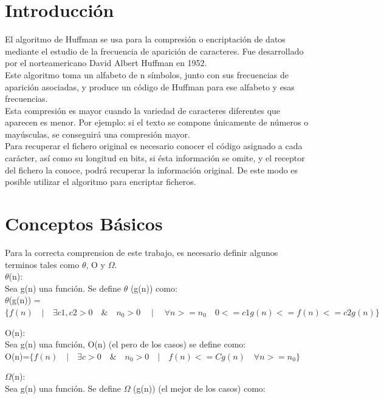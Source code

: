 \documentclass[spanish]{article}
\begin{document}
	\section{Introducci\'on}
	El algoritmo de Huffman se usa para la compresión o encriptación de datos mediante el estudio de la frecuencia de aparición de caracteres. Fue desarrollado por el norteamericano David Albert Huffman en 1952.\\
	Este algoritmo toma un alfabeto de n símbolos, junto con sus frecuencias de aparición asociadas, y produce un código de Huffman para ese alfabeto y esas frecuencias.\\
	Esta compresión es mayor cuando la variedad de caracteres diferentes que aparecen es menor. Por ejemplo: si el texto se compone únicamente de números o mayúsculas, se conseguirá una compresión mayor.\\
	Para recuperar el fichero original es necesario conocer el código asignado a cada carácter, así como su longitud en bits, si ésta información se omite, y el receptor del fichero la conoce, podrá recuperar la información original. De este modo es posible utilizar el algoritmo para encriptar ficheros.\\

\newpage
	\section{Conceptos B\'asicos}
	Para la correcta comprension de este trabajo, es necesario definir algunos terminos tales como $\theta$, O y $\Omega$.\\
	 $\theta$(n):\\
		Sea g(n) una función. Se define  $\theta$ (g(n)) como:\\
		
		 	$\theta$(g(n)) = $\{ f(n) \quad | \quad \exists c1,c2>0 \quad \& \quad n_{0}>0 \quad \mid \quad \forall n>=n_{0} \quad 0<= c1g(n) <= f(n) <= c2g(n) \}$
	\bigskip		 	
		 	
	O(n):\\
		Sea  g(n)  una función, O(n) (el pero de los casos) se define como:\\
		
			\hspace{1cm}O(n)=$\{f(n) \quad | \quad \exists c >0 \quad \& \quad n_{0}>0 \quad | \quad f(n) <= Cg(n) \quad \forall  n>= n_{0} \}$
	\bigskip
	
	$\Omega$(n):\\
	Sea  g(n)  una función. Se define $\Omega$ (g(n)) (el mejor de los casos) como:\\
\end{document}
